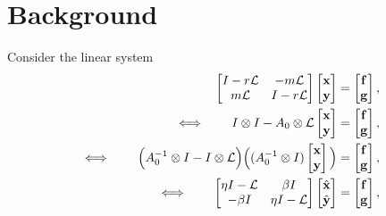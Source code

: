 \documentclass[a4paper,10pt]{article}
\begin{document}
\allowdisplaybreaks

\section{Background}

Consider the linear system
%
\begin{align}\nonumber
\begin{bmatrix} I - r\mathcal{L} & -m\mathcal{L} \\ m\mathcal{L} & I - r\mathcal{L} \end{bmatrix}
	\begin{bmatrix} \mathbf{x}\\\mathbf{y}\end{bmatrix} & =
	\begin{bmatrix} \mathbf{f}\\\mathbf{g}\end{bmatrix}, \\
\Longleftrightarrow\hspace{5ex}
I\otimes I - A_0\otimes \mathcal{L}
	\begin{bmatrix} \mathbf{x}\\\mathbf{y}\end{bmatrix} & =
	\begin{bmatrix} \mathbf{f}\\\mathbf{g}\end{bmatrix}, \nonumber\\
\Longleftrightarrow\hspace{5ex}
\Big(A_0^{-1}\otimes I - I\otimes \mathcal{L}\Big)\Big((A_0^{-1}\otimes I)
	\begin{bmatrix} \mathbf{x}\\\mathbf{y}\end{bmatrix}\Big) & =
	\begin{bmatrix} \mathbf{f}\\\mathbf{g}\end{bmatrix}, \nonumber\\
\Longleftrightarrow\hspace{5ex}
\begin{bmatrix} \eta I -\mathcal{L} & \beta I\\ -\beta I & \eta I - \mathcal{L} \end{bmatrix}
	\begin{bmatrix} \hat{\mathbf{x}}\\\hat{\mathbf{y}}\end{bmatrix} & =
	\begin{bmatrix} \mathbf{f}\\\mathbf{g}\end{bmatrix},\label{eq:2x2}
\end{align}
\end{document}
